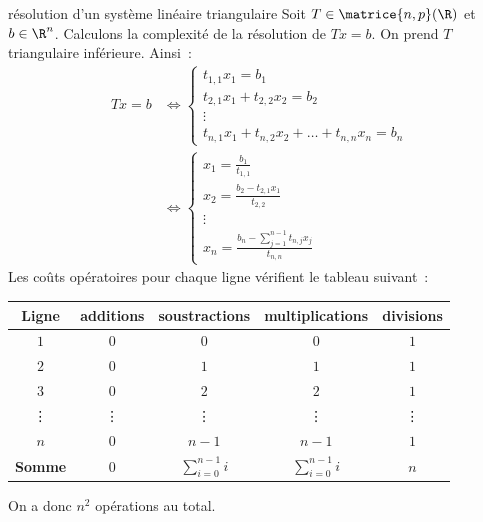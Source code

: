 \begin{exemple}{}{résolution d'un système linéaire triangulaire}
    Soit $T \in \matrice{n,p}(\R)$ et $b \in \R^n$. Calculons la complexité de la résolution de $Tx = b$. On prend $T$ triangulaire inférieure. Ainsi~:
    \begin{align*}
        Tx = b &\Leftrightarrow \begin{cases}
            t_{1,1}x_1 = b_1\\
            t_{2,1}x_1 + t_{2,2}x_2 = b_2\\
            \vdots\\
            t_{n,1}x_1 + t_{n,2}x_2 + \dots + t_{n,n}x_n = b_n
        \end{cases}\\
        &\Leftrightarrow \begin{cases}
            x_1 = \frac{b_1}{t_{1,1}}\\
            x_2 = \frac{b_2 - t_{2,1}x_1}{t_{2,2}}\\
            \vdots\\
            x_n = \frac{b_n - \sum_{j=1}^{n-1} t_{n,j}x_j}{t_{n,n}}
        \end{cases}
    \end{align*}
    Les coûts opératoires pour chaque ligne vérifient le tableau suivant~:
    \begin{center}
        \begin{tabular}{c|c|c|c|c|}
            \textbf{Ligne} & \textbf{additions} & \textbf{soustractions} &\textbf{multiplications} & \textbf{divisions}\\
            \hline
            $1$ & $0$ & $0$ & $0$ & $1$\\
            \hline
            $2$ & $0$ & $1$ & $1$ & $1$\\
            \hline
            $3$ & $0$ & $2$ & $2$ & $1$\\
            \hline
            \vdots & \vdots & \vdots & \vdots & \vdots\\
            \hline
            $n$ & $0$ & $n-1$ & $n-1$ & $1$\\
            \hhline{=|=|=|=|=|}
            \textbf{Somme} & $0$ & $\displaystyle\sum_{i=0}^{n-1} i$ & $\displaystyle\sum_{i=0}^{n-1} i$ & $n$\\
        \end{tabular}
    \end{center}
    On a donc $n^2$ opérations au total.
    
    
\end{exemple}

